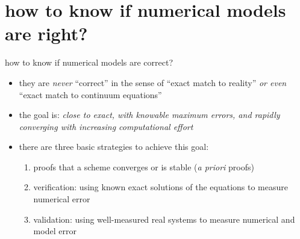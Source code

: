 \documentclass[10pt,hyperref={pdfpagelabels=true}]{beamer}
\begin{document}
\section[on being right]{how to know if numerical models are right?}

\begin{frame}{how to know if numerical models are correct?}

\begin{itemize}
\item they are \emph{never} ``correct'' in the sense of ``exact match to reality'' \emph{or even} ``exact match to continuum equations''

\bigskip
\item the \alert{goal} is: \emph{close to exact, with knowable maximum errors, and rapidly converging with increasing computational effort}
\item there are three basic strategies to achieve this goal:
    \begin{enumerate}
    \item proofs that a scheme converges or is stable (\emph{a priori} proofs)
    \item \alert{verification}: using known exact solutions of the equations to measure numerical error
    \item \alert{validation}: using well-measured real systems to measure numerical and model error
    \end{enumerate}
\end{itemize}
\end{frame}
\end{document}
